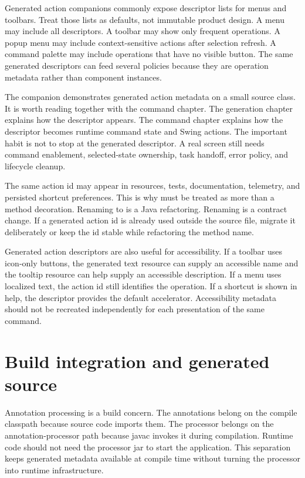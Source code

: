 Generated action companions commonly expose descriptor lists for menus and
toolbars. Treat those lists as defaults, not immutable product design. A menu
may include all descriptors. A toolbar may show only frequent operations. A
popup menu may include context-sensitive actions after selection refresh. A
command palette may include operations that have no visible button. The same
generated descriptors can feed several policies because they are operation
metadata rather than component instances.

The \generatedActionExample{} companion demonstrates generated action metadata
on a small source class. It is worth reading together with the command chapter.
The generation chapter explains how the descriptor appears. The command
chapter explains how the descriptor becomes runtime command state and Swing
actions. The important habit is not to stop at the generated descriptor. A
real screen still needs command enablement, selected-state ownership, task
handoff, error policy, and lifecycle cleanup.

The same action id may appear in resources, tests, documentation, telemetry,
and persisted shortcut preferences. This is why 
must be treated as more than a method decoration. Renaming  to
 is a Java refactoring. Renaming  is a
contract change. If a generated action id is already used outside the source
file, migrate it deliberately or keep the id stable while refactoring the
method name.

Generated action descriptors are also useful for accessibility. If a toolbar
uses icon-only buttons, the generated text resource can supply an accessible
name and the tooltip resource can help supply an accessible description. If a
menu uses localized text, the action id still identifies the operation. If a
shortcut is shown in help, the descriptor provides the default accelerator.
Accessibility metadata should not be recreated independently for each
presentation of the same command.

\section{Build integration and generated source}

Annotation processing is a build concern. The annotations belong on the
compile classpath because source code imports them. The processor belongs on
the annotation-processor path because javac invokes it during compilation.
Runtime code should not need the processor jar to start the application. This
separation keeps generated metadata available at compile time without turning
the processor into runtime infrastructure.

